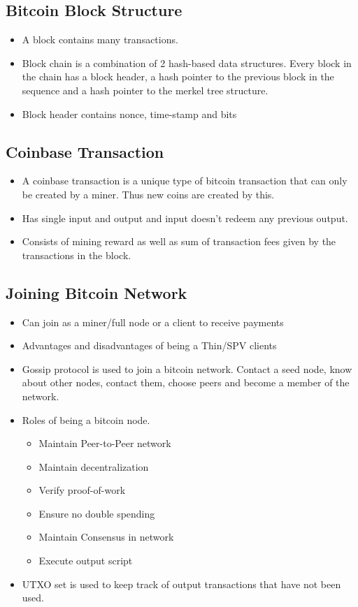 \documentclass[10pt,a4paper]{article}
\begin{document}
\subsection{Bitcoin Block Structure}
\begin{itemize}
\item A block contains many transactions.
\item Block chain is a combination of 2 hash-based data structures.  Every block in the chain has a block header, a hash pointer to the previous block in the sequence and a hash pointer to the merkel tree structure.
\item Block header contains nonce, time-stamp and bits
\end{itemize}
\subsection{Coinbase Transaction}
\begin{itemize}
\item A coinbase transaction is a unique type of bitcoin transaction that can only be created by a miner. Thus new coins are created by this.
\item Has single input and output and input doesn't redeem any previous output.
\item Consists of mining reward as well as sum of transaction fees given by the transactions in the block.
\end{itemize}
\subsection{Joining Bitcoin Network}
\begin{itemize}
\item Can join as a miner/full node or a client to receive payments
\item Advantages and disadvantages of being a Thin/SPV clients
\item Gossip protocol is used to join a bitcoin network. Contact a seed node, know about other nodes, contact them, choose peers and become a member of the network.
\item Roles of being a bitcoin node.
\begin{itemize}
\item Maintain Peer-to-Peer network
\item Maintain decentralization 
\item Verify proof-of-work 
\item Ensure no double spending
\item Maintain Consensus in network
\item Execute output script
\end{itemize}
\item UTXO set is used to keep track of output transactions that have not been used.
\end{itemize}
\end{document}

